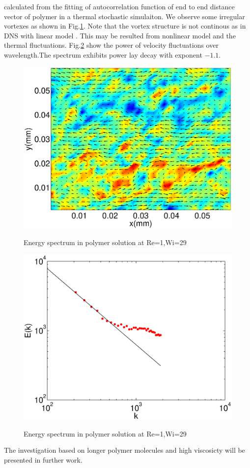 \documentclass[aps,pre,twocolumn,showpacs,superscriptaddress,groupedaddress]{revtex4}  %
\begin{document}
calculated from the fitting of autocorrelation function of end to end distance vector of polymer in a thermal stochastic simulaiton.
We observe some irregular vortexes  as shown in Fig.\ref{fig:vorpols}. Note that the vortex structure is not continous as in DNS with linear model \cite{berti08}.
This may be resulted from nonlinear model and the thermal fluctuations.
Fig.\ref{fig:spepols} show the power of velocity fluctuations over wavelength.The spectrum exhibits power lay decay with exponent $-1.1$.
\begin{figure}
 \includegraphics[scale=0.35]{img/vorpols}
\label{fig:vorpols}
\caption{Energy spectrum in polymer solution at Re=1,Wi=29}
\end{figure}
\begin{figure}
 \includegraphics[scale=0.35]{img/spepols}
\label{fig:spepols}
\caption{Energy spectrum in polymer solution at Re=1,Wi=29}
\end{figure}
The investigation based on longer polymer molecules and high viscosicty will be presented in further work.\\


\end{document}
